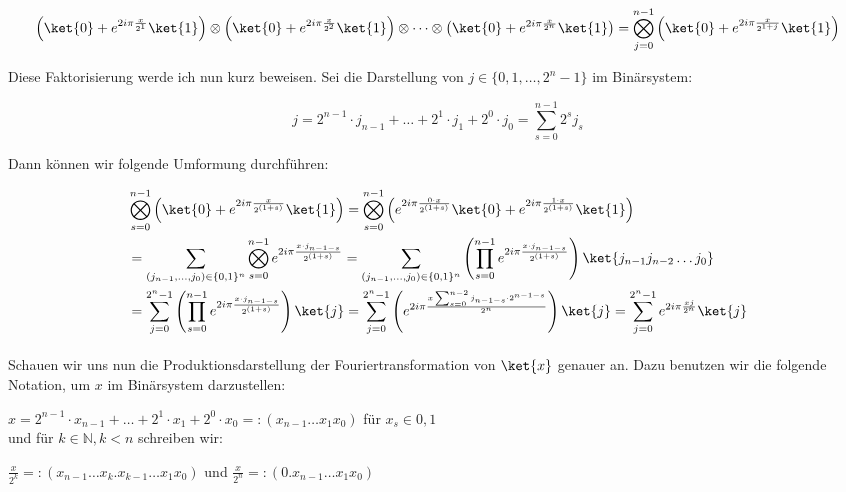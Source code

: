 \begin{align*}
    \left(\ket{0} + e^{2i\pi\frac{x}{2^{1}}}\ket{1}\right)\otimes\left(\ket{0} + e^{2i\pi\frac{x}{2^{2}}}\ket{1}\right)\otimes\cdots\otimes\left(\ket{0} + e^{2i\pi\frac{x}{2^{n}}}\ket{1}\right) = \bigotimes_{j = 0}^{n - 1}\left(\ket{0} + e^{2i\pi\frac{x}{2^{1 + j}}}\ket{1}\right)
\end{align*}

Diese Faktorisierung werde ich nun kurz beweisen. Sei die Darstellung von $j \in \{0, 1, \dots, 2^n - 1\}$ im Binärsystem:

$$j=2^{n-1}\cdot j_{n-1}+\ldots + 2^1\cdot j_1+2^0\cdot j_0 = \sum_{s = 0}^{n - 1}2^sj_s$$

Dann können wir folgende Umformung durchführen:

\begin{align*}
&\bigotimes_{s = 0}^{n - 1}{\left( \ket{0} + e^{2i\pi\frac{x}{2^{(1 + s)}}}\ket{1} \right)} = \bigotimes_{s = 0}^{n - 1}{\left( e^{2i\pi\frac{0\cdot x}{2^{(1 + s)}}}\ket{0} + e^{2i\pi\frac{1 \cdot x}{2^{(1 + s)}}}\ket{1} \right)} \\ &= \sum_{(j_{n-1},\dots,j_0)\in \{0, 1\}^n}\bigotimes_{s = 0}^{n - 1}e^{2i\pi\frac{x\cdot j_{n - 1 - s}}{2^{(1 + s)}}} = \sum_{(j_{n-1},\dots,j_0)\in \{0, 1\}^n}\left( \prod_{s = 0}^{n - 1}e^{2i\pi\frac{x\cdot j_{n - 1 - s}}{2^{(1 + s)}}} \right)\ket{j_{n - 1}j_{n - 2}\dots j_0} \\ &= \sum_{j = 0}^{2^n - 1} \left( \prod_{s = 0}^{n - 1}e^{2i\pi\frac{x\cdot j_{n - 1 - s}}{2^{(1 + s)}}} \right) \ket{j} = \sum_{j = 0}^{2^n - 1}\left( e^{2i\pi\frac{x\sum_{s = 0}^{n - 2}{j_{n - 1 - s}\cdot 2^{n - 1 - s}}}{2^n}} \right)\ket{j} = \sum_{j = 0}^{2^n - 1}e^{2i\pi\frac{xj}{2^n}}\ket{j}
\end{align*}
\paragraph{}

\noindent Schauen wir uns nun die Produktionsdarstellung der Fouriertransformation von $\ket{x}$ genauer an. Dazu benutzen wir die folgende Notation, um $x$ im Binärsystem darzustellen:

$x = 2^{n - 1}\cdot x_{n - 1} + \dots + 2^1 \cdot x_1 + 2^0 \cdot x_0 =: (x_{n - 1}\dots x_1x_0)$ \quad für $x_s \in {0, 1}$ \\
und für $k \in \mathbb{N}, k < n$ schreiben wir:

$\frac{x}{2^k} =: (x_{n - 1}\dots x_k.x_{k - 1}\dots x_1x_0)$ \quad und \quad $\frac{x}{2^n} =: (0.x_{n - 1}\dots x_1x_0)$

